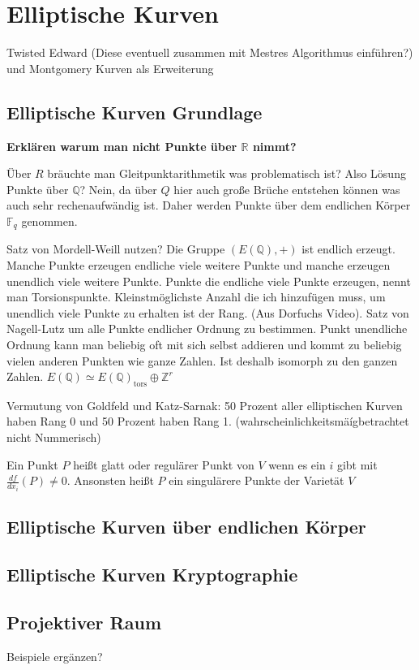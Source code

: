 \chapter{Elliptische Kurven}

Twisted Edward (Diese eventuell zusammen mit Mestres Algorithmus einführen?) und Montgomery Kurven als Erweiterung
\section{Elliptische Kurven Grundlage}
\textbf{Erklären warum man nicht Punkte über $\mathbb{R}$ nimmt?}

Über $R$ bräuchte man Gleitpunktarithmetik was problematisch ist? Also Lösung Punkte über $\mathbb{Q}$?
Nein, da über $Q$ hier auch große Brüche entstehen können was auch sehr rechenaufwändig ist. Daher werden Punkte über dem endlichen Körper $\mathbb{F}_q$ genommen.

Satz von Mordell-Weill nutzen? Die Gruppe $(E(\mathbb{Q}),+)$ ist endlich erzeugt. Manche Punkte erzeugen endliche viele weitere Punkte und manche erzeugen unendlich viele weitere Punkte. Punkte die endliche viele Punkte erzeugen, nennt man Torsionspunkte. Kleinstmöglichste Anzahl die ich hinzufügen muss, um unendlich viele Punkte zu erhalten ist der Rang. (Aus Dorfuchs Video).
Satz von Nagell-Lutz um alle Punkte endlicher Ordnung zu bestimmen.
Punkt unendliche Ordnung kann man beliebig oft mit sich selbst addieren und kommt zu beliebig vielen anderen Punkten wie ganze Zahlen. Ist deshalb isomorph zu den ganzen Zahlen. $E(\mathbb{Q})\simeq E(\mathbb{Q})_{\operatorname{tors}}\oplus\mathbb{Z}^r$

Vermutung von Goldfeld und Katz-Sarnak: 50 Prozent aller elliptischen Kurven haben Rang 0 und 50 Prozent haben Rang 1. (wahrscheinlichkeitsmäígbetrachtet nicht Nummerisch)


\begin{definition}
    Ein Punkt $P$ heißt glatt oder regulärer Punkt von $V$ wenn es ein $i$ gibt mit $\frac{df}{dx_i}(P)\neq 0$. Ansonsten heißt $P$ ein singulärere Punkte der Varietät $V$
\end{definition}
\cite[S.82]{Hulek12}
\section{Elliptische Kurven über endlichen Körper}
\section{Elliptische Kurven Kryptographie}
\section{Projektiver Raum}


Beispiele ergänzen?